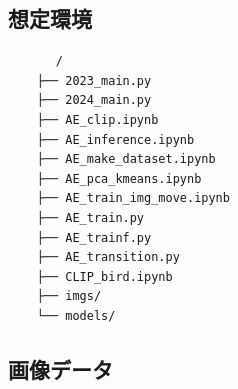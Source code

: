 \documentclass[a4paper, 12pt]{report}
\begin{document}
\subsection{想定環境}

\begin{verbatim}
    　 /
    ├── 2023_main.py
    ├── 2024_main.py
    ├── AE_clip.ipynb
    ├── AE_inference.ipynb
    ├── AE_make_dataset.ipynb
    ├── AE_pca_kmeans.ipynb
    ├── AE_train_img_move.ipynb
    ├── AE_train.py
    ├── AE_trainf.py
    ├── AE_transition.py
    ├── CLIP_bird.ipynb
    ├── imgs/
    └── models/
    \end{verbatim}


\subsection{画像データ}
\end{document}
